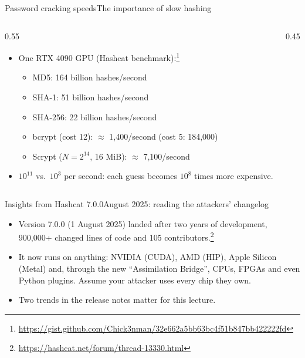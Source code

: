 \ifdefined\PRESENTATION\else\PassOptionsToClass{handout}{beamer}\fi\documentclass[aspectratio=169, lualatex]{beamer}
\begin{document}
\begin{frame}{Password cracking speeds}{The importance of slow hashing}
	\begin{columns}[c]
		\begin{column}{0.55\textwidth}
			\begin{itemize}
				\item One RTX 4090 GPU (Hashcat benchmark):\footnote{\url{https://gist.github.com/Chick3nman/32e662a5bb63bc4f51b847bb422222fd}}
				      \begin{itemize}
					      \item MD5: 164 billion hashes/second
					      \item SHA-1: 51 billion hashes/second
					      \item SHA-256: 22 billion hashes/second
					      \item bcrypt (cost 12): $\approx$ 1,400/second (cost 5: 184,000)
					      \item Scrypt ($N = 2^{14}$, 16 MiB): $\approx$ 7,100/second
				      \end{itemize}
				\item $10^{11}$ vs.\ $10^{3}$ per second: each guess becomes $10^8$ times more expensive.
			\end{itemize}
		\end{column}
		\begin{column}{0.45\textwidth}
		\end{column}
	\end{columns}
\end{frame}

\begin{frame}{Insights from Hashcat 7.0.0}{August 2025: reading the attackers' changelog}
	\begin{itemize}
		\item Version 7.0.0 (1 August 2025) landed after two years of development, 900,000+ changed lines of code and 105 contributors.\footnote{\url{https://hashcat.net/forum/thread-13330.html}}
		\item It now runs on anything: NVIDIA (CUDA), AMD (HIP), Apple Silicon (Metal) and, through the new ``Assimilation Bridge'', CPUs, FPGAs and even Python plugins. Assume your attacker uses every chip they own.
		\item Two trends in the release notes matter for this lecture.
	\end{itemize}
\end{frame}
\end{document}
